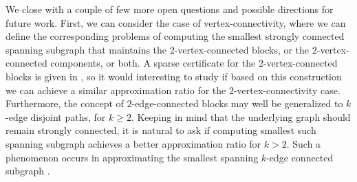 \documentclass[11pt]{article}
\begin{document}
We close with a couple of few more open questions and possible directions for future work.
First, we can consider the case of vertex-connectivity, where we can define the corresponding problems of computing the smallest strongly connected spanning subgraph that maintains the $2$-vertex-connected blocks, or
the $2$-vertex-connected components, or both.
A sparse certificate for the $2$-vertex-connected blocks is given in \cite{2VCB}, so it would interesting to study if based on this construction we can achieve a similar approximation ratio for the $2$-vertex-connectivity case.
Furthermore, the concept of $2$-edge-connected blocks may well be generalized to $k$-edge disjoint paths, for $k \geq 2$.
Keeping in mind that the underlying graph should remain strongly connected, it is natural to ask if computing smallest such spanning subgraph achieves a better approximation ratio for $k > 2$.
Such a phenomenon occurs in approximating the smallest spanning $k$-edge connected subgraph \cite{CT00,GGTW:kECSS:2009}.





\end{document}
